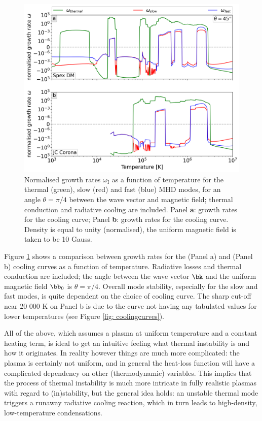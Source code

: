 \begin{figure}[t]
  \centering
  \includegraphics[width=\textwidth]{coolcurve_comparison.png}
  \caption{
    Normalised growth rates $\omega_\text{I}$ as a function of temperature for the thermal (green), slow (red) and fast (blue) MHD modes, for an angle $\theta = \pi/4$ between the wave vector and magnetic field; thermal conduction and radiative cooling are included. Panel \textbf{a}: growth rates for the {\spexdm} cooling curve; Panel \textbf{b}: growth rates for the {\jccorona} cooling curve. Density is equal to unity (normalised), the uniform magnetic field is taken to be 10 Gauss.
  }
  \label{fig: coolcurve_comparison}
\end{figure}

Figure \ref{fig: coolcurve_comparison} shows a comparison between growth rates for the {\spexdm} (Panel a) and {\jccorona} (Panel b) cooling curves as a function of temperature. Radiative losses and thermal conduction are included; the angle between the wave vector $\bk$ and the uniform magnetic field $\bb_0$ is $\theta = \pi/4$. Overall mode stability, especially for the slow and fast modes, is quite dependent on the choice of cooling curve. The sharp cut-off near 20 000 K on Panel b is due to the {\jccorona} curve not having any tabulated values for lower temperatures (see Figure \ref{fig: coolingcurves}).

All of the above, which assumes a plasma at uniform temperature and a constant heating term, is ideal to get an intuitive feeling what thermal instability is and how it originates. In reality however things are much more complicated: the plasma is certainly not uniform, and in general the heat-loss function will have a complicated dependency on other (thermodynamic) variables. This implies that the process of thermal instability is much more intricate in fully realistic plasmas with regard to (in)stability, but the general idea holds: an unstable thermal mode triggers a runaway radiative cooling reaction, which in turn leads to high-density, low-temperature condensations.


